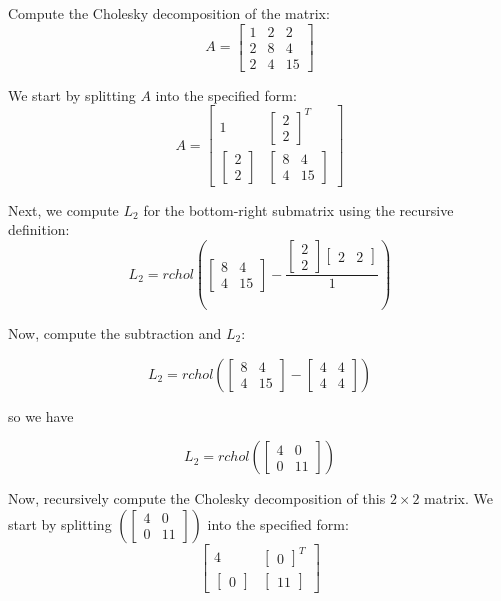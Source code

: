 \documentclass[12pt]{article}
\begin{document}
\begin{enumerate}[leftmargin=\labelsep]
Compute the Cholesky decomposition of the matrix:
\[
A = \begin{bmatrix}
1 & 2 & 2 \\
2 & 8 & 4 \\
2 & 4 & 15
\end{bmatrix}
\]

We start by splitting \(A\) into the specified form:
\[
A = \begin{bmatrix}
1 & \begin{bmatrix} 2 \\ 2 \end{bmatrix}^T \\
\begin{bmatrix} 2 \\ 2 \end{bmatrix} & \begin{bmatrix} 8 & 4 \\ 4 & 15 \end{bmatrix}
\end{bmatrix}
\]

Next, we compute \(L_2\) for the bottom-right submatrix using the recursive definition:
\[
L_2 = rchol\left(\begin{bmatrix} 8 & 4 \\ 4 & 15 \end{bmatrix} - \frac{\begin{bmatrix} 2 \\ 2 \end{bmatrix} \begin{bmatrix} 2 & 2 \end{bmatrix}}{1}\right)
\]

Now, compute the subtraction and \(L_2\):

\[
L_2 = rchol\left(\begin{bmatrix} 8 & 4 \\ 4 & 15 \end{bmatrix} - \begin{bmatrix} 4 & 4 \\ 4 & 4 \end{bmatrix}\right)
\]

so we have 

\[
L_2 = rchol\left(\begin{bmatrix} 4 & 0 \\ 0 & 11 \end{bmatrix}\right)
\]

Now, recursively compute the Cholesky decomposition of this \(2 \times 2\) matrix. We start by splitting $\left(\begin{bmatrix} 4 & 0 \\ 0 & 11 \end{bmatrix}\right)$ into the specified form:
\[
\begin{bmatrix}
4 & \begin{bmatrix} 0 \end{bmatrix}^T \\ 
\begin{bmatrix} 0 \end{bmatrix} & \begin{bmatrix} 11 \end{bmatrix}
\end{bmatrix}
\]


\end{enumerate}
\end{document}
